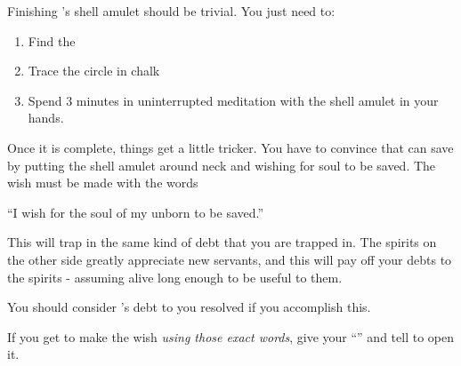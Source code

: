 \documentclass[green]{NeptuneBall}
\begin{document}
\name{\gAmulet{}}

Finishing \cAriel{}'s shell amulet should be trivial. You just need to:
\begin{enumerate}
\item Find the \sRunicCircle{}
\item Trace the circle in chalk
\item Spend 3 minutes in uninterrupted meditation with the shell amulet in your hands.
\end{enumerate}

Once it is complete, things get a little tricker. You have to convince \cAriel{} that \cAriel{\they} can save \cAriel{\their}  by putting the shell amulet around \cAriel{\their} neck and wishing for  soul to be saved. The wish must be made with the words

``I wish for the soul of my unborn  to be saved.''

This will trap \cAriel{} in the same kind of debt that you are trapped in. The spirits on the other side greatly appreciate new servants, and this will pay off your debts to the spirits - assuming \cAriel{\they}  alive long enough to be useful to them.

You should consider \cAriel{}'s debt to you resolved if you accomplish this.

If you get \cAriel{} to make the wish \emph{using those exact words}, give \cAriel{\them} your ``\mMEnvelope{\MYname}'' and tell \cAriel{\them} to open it.
\end{document}

